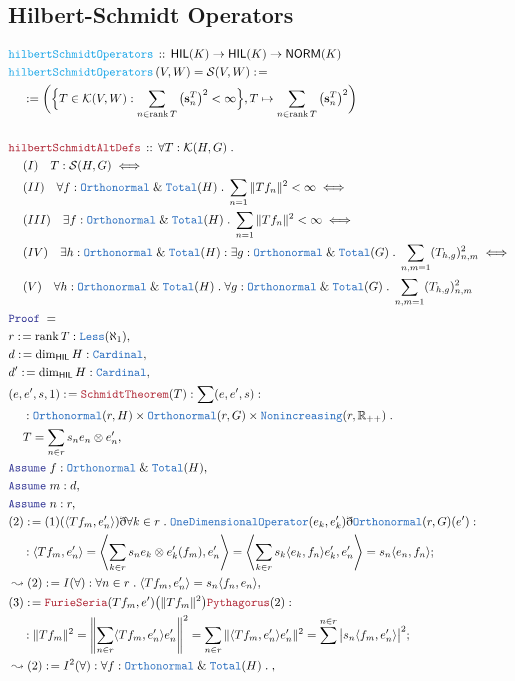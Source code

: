 \documentclass[12pt]{scrartcl}
\newcommand{\TYPE}[1]{\textcolor{NavyBlue}{\mathtt{#1}}}
\newcommand{\FUNC}[1]{\textcolor{Cerulean}{\mathtt{#1}}}
\newcommand{\LOGIC}[1]{\textcolor{Blue}{\mathtt{#1}}}
\newcommand{\THM}[1]{\textcolor{Maroon}{\mathtt{#1}}}
\renewcommand{\.}{\; . \;}
\newcommand{\de}{: \kern 0.1pc =}
\newcommand{\Act}[1]{\left( #1 \right)}
\newcommand{\Theorem}[2]{& \THM{#1} \, :: \, #2 \\ & \Proof = \\ }
\newcommand{\DeclareFunc}[2]{& \FUNC{#1} \, :: \, #2 \\}
\newcommand{\DefineNamedFunc}[4]{&  \FUNC{#1}\Act{#2} = #3 \de #4 \\}
\newcommand{\NewLine}{\\ & \kern 1pc}
\newcommand{\Page}[1]{\begin{align*} #1 \end{align*} \newpage   }
\newcommand{ \bd }{ \ByDef }
\renewcommand{\And}{\; \& \;}
\newcommand{\Reals}{\mathbb{R} }
\newcommand{\Say}[3]{& #1 \de #2 : #3, \\}
\newcommand{\Conclude}[3]{& #1 \de #2 : #3; \\}
\newcommand{\Derive}[3]{& \leadsto #1 \de #2 : #3, \\}
\newcommand{\A}{\LOGIC{Assume} \;}
\newcommand{\Assume}[2]{& \A #1 : #2, \\}
\newcommand{\ByDef}{\eth}
\newcommand{\Proof}{\LOGIC{Proof} \; }
\DeclareMathOperator*{\rank}{rank}
\newcommand{\NORM}{\mathsf{NORM}} %
\newcommand{\HIL}{\mathsf{HIL}} %
\newcommand{\K}{\mathcal{K}} %
\newcommand{\s}{\mathbf{s}}
\renewcommand{\S}{\mathcal{S}}
\begin{document}
\subsection{Hilbert-Schmidt Operators}
\Page{
	\DeclareFunc{hilbertSchmidtOperators}{  \HIL(K) \to \HIL(K) \to \NORM(K)   }
	\DefineNamedFunc{hilbertSchmidtOperators}{V,W}{\S(V,W)}
	{
	\NewLine :=	
	\bigg( \Big\{ T \in \K(V,W) : \sum_{n \in \rank T}\big(\s^T_n\big)^2 < \infty  \Big\} 
	, T \mapsto \sum_{n \in \rank T} \big( \s^T_n   \big)^2
	\bigg)
	  }
\\
\Theorem{hilbertSchmidtAltDefs}{
  \forall T : \K(H,G) \. \NewLine
  (I) \quad T : \S(H,G) \iff \NewLine
  (II) \quad \forall f : \TYPE{Orthonormal} \And \TYPE{Total}(H) \. \sum_{n = 1} \| Tf_n \|^2 < \infty \iff \NewLine
  (III) \quad \exists f : \TYPE{Orthonormal} \And \TYPE{Total}(H) \. \sum_{n = 1} \| Tf_n \|^2 < \infty \iff \NewLine
  (IV)  \quad \exists h : \TYPE{Orthonormal} \And \TYPE{Total}(H) : 
   \exists g : \TYPE{Orthonormal} \And \TYPE{Total}(G) \. \sum_{n,m = 1} (T_{h,g})_{n,m}^2  \iff \NewLine
  (V) \quad \forall h : \TYPE{Orthonormal} \And \TYPE{Total}(H) \.
      \forall g : \TYPE{Orthonormal} \And \TYPE{Total}(G) \. \sum_{n,m = 1} (T_{h,g})_{n,m}^2
}
\Say{r}{\rank T}{\TYPE{Less}(\aleph_1)}
\Say{d}{\dim_\HIL H}{\TYPE{Cardinal}}
\Say{d'}{\dim_\HIL H}{\TYPE{Cardinal}}
\Say{(e,e',s,1) }{ \THM{SchmidtTheorem}(T) }{ \sum (e,e',s) : 
\NewLine : \TYPE{Orthonormal}(r,H) \times \TYPE{Orthonormal}(r,G) \times \TYPE{Nonincreasing}(r, \Reals_{++}) \.
\NewLine  T = \sum_{n \in r} s_n e_n \otimes e'_n   }
\Assume{f}{\TYPE{Orthonormal} \And \TYPE{Total}(H) }
\Assume{m}{d}
\Assume{n}{r}
\Conclude{(2)}{ (1)(\langle Tf_m,e'_n \rangle)\bd \forall k \in r \. \TYPE{OneDimensionalOperator}(e_k,e_k') \bd \TYPE{Orthonormal}(r,G)(e')  }
{ \NewLine : \langle Tf_m, e'_n  \rangle = 
 \left \langle \sum_{k \in r} s_n e_k \otimes e'_k(f_m)     ,e'_n  \right \rangle = 
\left \langle \sum_{k \in r}  s_k\langle e_k, f_n  \rangle e'_k   , e'_n   \right \rangle 
=  s_n \langle e_n, f_n \rangle                                                           
}
\Derive{(2)}{I(\forall)}{ \forall n \in r \. \langle Tf_m,e'_n \rangle  = s_n \langle f_n, e_n \rangle  }
\Conclude{(3)}{\THM{FurieSeria}(Tf_m,e')\big(\| Tf_m \|^2 \big)\THM{Pythagorus}(2) }{ 
\NewLine :
\| Tf_m  \|^2 = \left\|  \sum_{n \in r} \langle Tf_m, e'_n \rangle e'_n  \right\|^2
  =    \sum_{n \in r} \| \langle Tf_m, e'_n  \rangle e'_n  \|^2 = \sum^{n \in r} \big| s_n \langle f_m,e'_n \rangle \big|^2
}
\Derive{(2)}{I^2(\forall) }
{ \forall f : \TYPE{Orthonormal} \And \TYPE{Total}(H) \. 
}}
\end{document}
